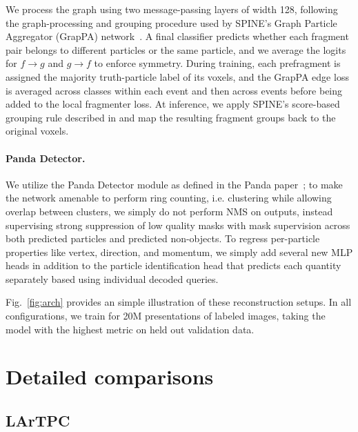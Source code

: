 We process the graph using two message-passing layers of width 128, following the graph-processing and grouping procedure used by SPINE’s Graph Particle Aggregator (GrapPA) network~\cite{domine2020scalable, drielsma2021clustering}. A final classifier predicts whether each fragment pair belongs to different particles or the same particle, and we average the logits for $f\rightarrow g$ and $g\rightarrow f$ to enforce symmetry. During training, each prefragment is assigned the majority truth-particle label of its voxels, and the GrapPA edge loss is averaged across classes within each event and then across events before being added to the local fragmenter loss. At inference, we apply SPINE’s score-based grouping rule described in \cite{drielsma2021clustering} and map the resulting fragment groups back to the original voxels.

\paragraph{Panda Detector.} We utilize the Panda Detector module as defined in the Panda paper~\citep{panda}; to make the network amenable to perform ring counting, i.e. clustering while allowing overlap between clusters, we simply do not perform NMS on outputs, instead supervising strong suppression of low quality masks with mask supervision across both predicted particles and predicted non-objects. To regress per-particle properties like vertex, direction, and momentum, we simply add several new MLP heads in addition to the particle identification head that predicts each quantity separately based using individual decoded queries.

Fig.~\ref{fig:arch} provides an simple illustration of these reconstruction setups. In all configurations, we train for 20M presentations of labeled images, taking the model with the highest metric on held out validation data.

\section{Detailed comparisons}

\subsection{LArTPC}

